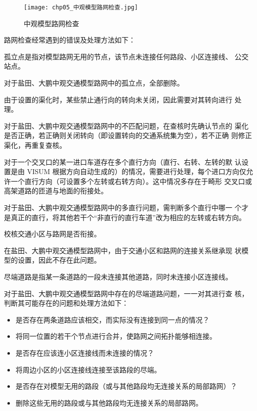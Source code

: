 \begin{figure}[!ht]
  \centering
  \texttt{[image: chp05\_中观模型路网检查.jpg]}
  \caption{中观模型路网检查\label{fig:chp05_中观模型路网检查} }
\end{figure}

路网检查经常遇到的错误及处理方法如下：


孤立点是指对模型路网无用的节点，该节点未连接任何路段、小区连接线、
公交站点。

对于盐田、大鹏中观交通模型路网中的孤立点，全部删除。


由于设置的渠化时，某些禁止通行向的转向未关闭，因此需要对其转向进行
处理。

对于盐田、大鹏中观交通模型路网中的不匹配问题，在查核时先确认节点的
渠化是否正确，若正确则关闭转向（即设置转向的交通系统集为空），若不正确
则修正渠化，再重复查核。


对于一个交叉口的某一进口车道存在多个直行方向（直行、右转、左转的默
认设置是由 VISUM 根据方向自动生成的）的情况，需要进行处理，每个进口方向仅允许一个直行方向（可设置多个左转或右转方向）。这中情况多存在于畸形
交叉口或高架道路的匝道与地面的衔接处。

对于盐田、大鹏中观交通模型路网中的多直行问题，需判断多个直行中哪一
个才是真正的直行，将其他若干个“非直行的直行车道”改为相应的左转或右转方向。


校核交通小区与路网是否衔接。

在盐田、大鹏中观交通模型路网中，由于交通小区和路网的连接关系继承现
状模型的设置，因此不存在此问题。


尽端道路是指某一条道路的一段未连接其他道路，同时未连接小区连接线。

对于盐田、大鹏中观交通模型路网中存在的尽端道路问题，一一对其进行查
核，判断其可能存在的问题和处理方法如下：

\begin{itemize}
\item[\XSolidBrush] 是否存在两条道路应该相交，而实际没有连接到同一点的情况？
\item[\Checkmark] 将同一位置的若干个节点进行合并，使路网之间拓扑能够相连接。
\item[\XSolidBrush] 是否存在应该连小区连接线而未连接的情况？
\item[\Checkmark] 将周边小区的小区连接线连接至该路段的尽端。
\item[\XSolidBrush] 是否存在对模型无用的路段（或与其他路段均无连接关系的局部路网）？
\item[\Checkmark] 删除这些无用的路段或与其他路段均无连接关系的局部路网。
\end{itemize}

